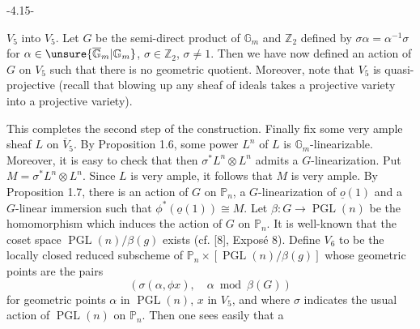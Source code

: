 \begin{center}-4.15-\end{center}

$V_5$ into $V_5$. Let $G$ be the semi-direct product of $\mathbb G_m$ and $\mathbb Z_2$ defined by $\sigma\alpha=\alpha^{-1}\sigma$ for $\alpha\in\unsure{\overline{\mathbb G}_m|\mathbb G_m}$, $\sigma\in\mathbb Z_2$, $\sigma\ne1$. Then we have now defined an action of $G$ on $V_5$ such that there is no geometric quotient. Moreover, note that $V_5$ is quasi-projective (recall that blowing up any sheaf of ideals takes a projective variety into a projective variety).

This completes the second step of the construction. Finally fix some very ample sheaf $L$ on $\overline V_5$. By Proposition 1.6, some power $L^n$ of $L$ is $\mathbb G_m$-linearizable. Moreover, it is easy to check that then $\sigma^*L^n\otimes L^n$ admits a $G$-linearization. Put $M=\sigma^*L^n\otimes L^n$. Since $L$ is very ample, it follows that $M$ is very ample. By Proposition 1.7, there is an action of $G$ on $\mathbb P_n$, a $G$-linearization of $\underline{o}(1)$ and a $G$-linear immersion
such that $\phi^*(\underline{o}(1))\cong M$. Let $\beta:G\longrightarrow\operatorname{PGL}(n)$ be the homomorphism which induces the action of $G$ on $\mathbb P_n$. It is well-known that the coset space $\operatorname{PGL}(n)/\beta(g)$ exists (cf. [8], Exposé 8). Define $V_6$ to be the locally closed reduced subscheme of $\mathbb P_n\times[\operatorname{PGL}(n)/\beta(g)]$ whose geometric points are the pairs
\[
(\sigma(\alpha,\phi x),\quad\alpha\bmod\beta(G))
\]
for geometric points $\alpha$ in $\operatorname{PGL}(n)$, $x$ in $V_5$, and where $\sigma$ indicates the usual action of $\operatorname{PGL}(n)$ on $\mathbb P_n$. Then one sees easily that a
